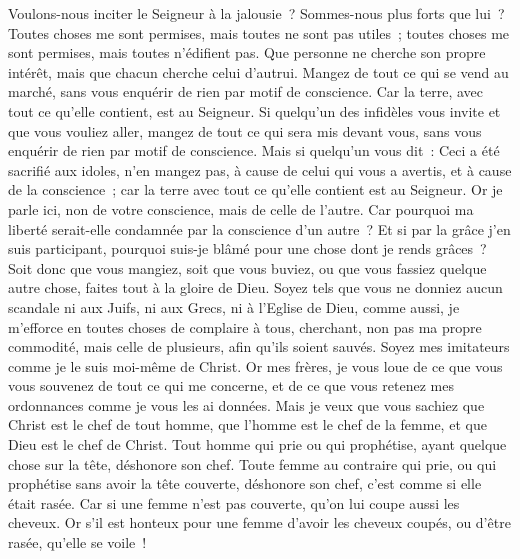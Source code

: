 \begin{multicols}{2}
Voulons-nous inciter le Seigneur à la jalousie~? Sommes-nous plus forts que lui~?
Toutes choses me sont permises, mais toutes ne sont pas utiles~; toutes choses me sont permises, mais toutes n'édifient pas.
Que personne ne cherche son propre intérêt, mais que chacun cherche celui d'autrui.
Mangez de tout ce qui se vend au marché, sans vous enquérir de rien par motif de conscience.
Car la terre, avec tout ce qu'elle contient, est au Seigneur.
Si quelqu'un des infidèles vous invite et que vous vouliez aller, mangez de tout ce qui sera mis devant vous, sans vous enquérir de rien par motif de conscience.
Mais si quelqu'un vous dit~: Ceci a été sacrifié aux idoles, n'en mangez pas, à cause de celui qui vous a avertis, et à cause de la conscience~; car la terre avec tout ce qu'elle contient est au Seigneur.
Or je parle ici, non de votre conscience, mais de celle de l'autre. Car pourquoi ma liberté serait-elle condamnée par la conscience d'un autre~?
Et si par la grâce j'en suis participant, pourquoi suis-je blâmé pour une chose dont je rends grâces~?
Soit donc que vous mangiez, soit que vous buviez, ou que vous fassiez quelque autre chose, faites tout à la gloire de Dieu.
Soyez tels que vous ne donniez aucun scandale ni aux Juifs, ni aux Grecs, ni à l'Eglise de Dieu,
comme aussi, je m'efforce en toutes choses de complaire à tous, cherchant, non pas ma propre commodité, mais celle de plusieurs, afin qu'ils soient sauvés.
\VerseOne{}Soyez mes imitateurs comme je le suis moi-même de Christ.
Or mes frères, je vous loue de ce que vous vous souvenez de tout ce qui me concerne, et de ce que vous retenez mes ordonnances comme je vous les ai données.
Mais je veux que vous sachiez que Christ est le chef de tout homme, que l'homme est le chef de la femme, et que Dieu est le chef de Christ.
Tout homme qui prie ou qui prophétise, ayant quelque chose sur la tête, déshonore son chef.
Toute femme au contraire qui prie, ou qui prophétise sans avoir la tête couverte, déshonore son chef, c'est comme si elle était rasée.
Car si une femme n'est pas couverte, qu'on lui coupe aussi les cheveux. Or s'il est honteux pour une femme d'avoir les cheveux coupés, ou d'être rasée, qu'elle se voile~!

\end{multicols}
